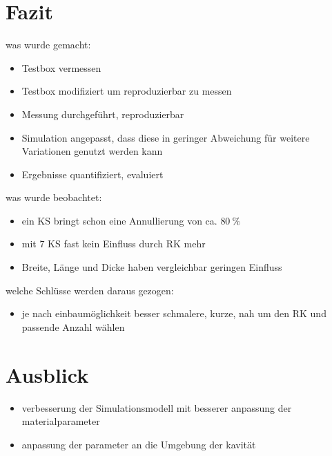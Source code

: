 \section{Fazit}
was wurde gemacht:
\begin{itemize}
	\item Testbox vermessen
	\item Testbox modifiziert um reproduzierbar zu messen
	\item Messung durchgef\"uhrt, reproduzierbar
	\item Simulation angepasst, dass diese in geringer Abweichung f\"ur weitere Variationen genutzt werden kann
	\item Ergebnisse quantifiziert, evaluiert
\end{itemize}
was wurde beobachtet:
\begin{itemize}
    \item ein KS bringt schon eine Annullierung von ca. $80~\%$
    \item mit 7 KS fast kein Einfluss durch RK mehr
    \item Breite, Länge und Dicke haben vergleichbar geringen Einfluss
\end{itemize}
welche Schlüsse werden daraus gezogen:
\begin{itemize}
    \item je nach einbaumöglichkeit besser schmalere, kurze, nah um den RK und passende Anzahl wählen
\end{itemize}

\section{Ausblick}
\begin{itemize}
    \item verbesserung der Simulationsmodell mit besserer anpassung der materialparameter
    \item anpassung der parameter an die Umgebung der kavität
    
\end{itemize}